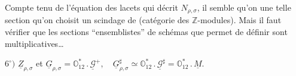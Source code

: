 Compte tenu de l'équation des lacets qui décrit $N_{\rho,\sigma}$, il semble qu'on  une telle section  qu'on choisit un scindage de
(catégorie des $\mathbb Z$-modules). Mais il faut vérifier que les sections \textquotedblleft ensemblistes\textquotedblright{} de schémas que  permet de définir sont multiplicatives\dots


\(6^\circ)\) \(\underline Z_{\rho,\sigma}\) et
\(\underline G_{\rho,\sigma}=\mathbb O_{12}^{*}\mathbin{.}\underline{\mathcal G}^{+},\quad
\underline G_{\rho,\sigma}^{\sharp}\simeq\mathbb O_{12}^{*}\mathbin{.}\underline{\mathcal G}^{\sharp}
=\mathbb O_{12}^{*}\mathbin{.}\underline M\).


